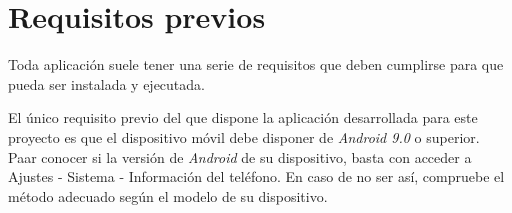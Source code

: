 
\section{Requisitos previos}
Toda aplicación suele tener una serie de requisitos que deben cumplirse para que pueda 
ser instalada y ejecutada.\medskip

El único requisito previo del que dispone la aplicación desarrollada para este proyecto es que 
el dispositivo móvil debe disponer de \textit{Android 9.0} o superior. Paar conocer si la versión 
de \textit{Android} de su dispositivo, basta con acceder a Ajustes - Sistema - Información del teléfono.
En caso de no ser así, compruebe el método adecuado según el modelo de su dispositivo.
